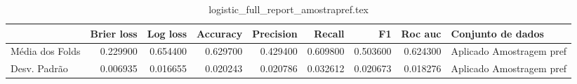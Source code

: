 \begin{table}
\centering
\caption{logistic_full_report_amostrapref.tex}
\label{logistic_full_report_amostrapref.tex}
\begin{tabular}{lrrrrrrrl}
\toprule
{} &  Brier  loss &  Log loss &  Accuracy  &  Precision  &   Recall  &       F1  &  Roc auc  &         Conjunto de dados \\
\midrule
Média dos Folds &     0.229900 &  0.654400 &   0.629700 &    0.429400 &  0.609800 &  0.503600 &  0.624300 &  Aplicado Amostragem pref \\
Desv. Padrão    &     0.006935 &  0.016655 &   0.020243 &    0.020786 &  0.032612 &  0.020673 &  0.018276 &  Aplicado Amostragem pref \\
\bottomrule
\end{tabular}
\end{table}
